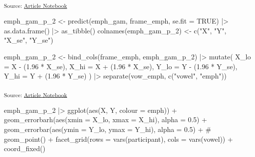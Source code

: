 \documentclass[
]{interact}
\newenvironment{Shaded}{\begin{snugshade}}{\end{snugshade}}
\newcommand{\AttributeTok}[1]{\textcolor[rgb]{0.40,0.45,0.13}{#1}}
\newcommand{\CommentTok}[1]{\textcolor[rgb]{0.37,0.37,0.37}{#1}}
\newcommand{\ConstantTok}[1]{\textcolor[rgb]{0.56,0.35,0.01}{#1}}
\newcommand{\FloatTok}[1]{\textcolor[rgb]{0.68,0.00,0.00}{#1}}
\newcommand{\FunctionTok}[1]{\textcolor[rgb]{0.28,0.35,0.67}{#1}}
\newcommand{\NormalTok}[1]{\textcolor[rgb]{0.00,0.23,0.31}{#1}}
\newcommand{\OtherTok}[1]{\textcolor[rgb]{0.00,0.23,0.31}{#1}}
\newcommand{\SpecialCharTok}[1]{\textcolor[rgb]{0.37,0.37,0.37}{#1}}
\newcommand{\StringTok}[1]{\textcolor[rgb]{0.13,0.47,0.30}{#1}}
\begin{document}
\textsubscript{Source:
\href{https://stefanocoretta.github.io/mv_uti/index.qmd.html}{Article
Notebook}}

\begin{Shaded}
\begin{Highlighting}[]
\NormalTok{emph\_gam\_p\_2 }\OtherTok{\textless{}{-}} \FunctionTok{predict}\NormalTok{(emph\_gam, frame\_emph, }\AttributeTok{se.fit =} \ConstantTok{TRUE}\NormalTok{) }\SpecialCharTok{|\textgreater{}}
  \FunctionTok{as.data.frame}\NormalTok{() }\SpecialCharTok{|\textgreater{}}
  \FunctionTok{as\_tibble}\NormalTok{()}
\FunctionTok{colnames}\NormalTok{(emph\_gam\_p\_2) }\OtherTok{\textless{}{-}} \FunctionTok{c}\NormalTok{(}\StringTok{"X"}\NormalTok{, }\StringTok{"Y"}\NormalTok{, }\StringTok{"X\_se"}\NormalTok{, }\StringTok{"Y\_se"}\NormalTok{)}

\NormalTok{emph\_gam\_p\_2 }\OtherTok{\textless{}{-}} \FunctionTok{bind\_cols}\NormalTok{(frame\_emph, emph\_gam\_p\_2) }\SpecialCharTok{|\textgreater{}}
  \FunctionTok{mutate}\NormalTok{(}
    \AttributeTok{X\_lo =}\NormalTok{ X }\SpecialCharTok{{-}}\NormalTok{ (}\FloatTok{1.96} \SpecialCharTok{*}\NormalTok{ X\_se),}
    \AttributeTok{X\_hi =}\NormalTok{ X }\SpecialCharTok{+}\NormalTok{ (}\FloatTok{1.96} \SpecialCharTok{*}\NormalTok{ X\_se),}
    \AttributeTok{Y\_lo =}\NormalTok{ Y }\SpecialCharTok{{-}}\NormalTok{ (}\FloatTok{1.96} \SpecialCharTok{*}\NormalTok{ Y\_se),}
    \AttributeTok{Y\_hi =}\NormalTok{ Y }\SpecialCharTok{+}\NormalTok{ (}\FloatTok{1.96} \SpecialCharTok{*}\NormalTok{ Y\_se)}
\NormalTok{  ) }\SpecialCharTok{|\textgreater{}} 
  \FunctionTok{separate}\NormalTok{(vow\_emph, }\FunctionTok{c}\NormalTok{(}\StringTok{"vowel"}\NormalTok{, }\StringTok{"emph"}\NormalTok{))}
\end{Highlighting}
\end{Shaded}

\textsubscript{Source:
\href{https://stefanocoretta.github.io/mv_uti/index.qmd.html}{Article
Notebook}}

\label{cell-fig-emph-part}
\begin{Shaded}
\begin{Highlighting}[]
\NormalTok{emph\_gam\_p\_2 }\SpecialCharTok{|\textgreater{}} 
  \FunctionTok{ggplot}\NormalTok{(}\FunctionTok{aes}\NormalTok{(X, Y, }\AttributeTok{colour =}\NormalTok{ emph)) }\SpecialCharTok{+}
  \FunctionTok{geom\_errorbarh}\NormalTok{(}\FunctionTok{aes}\NormalTok{(}\AttributeTok{xmin =}\NormalTok{ X\_lo, }\AttributeTok{xmax =}\NormalTok{ X\_hi), }\AttributeTok{alpha =} \FloatTok{0.5}\NormalTok{) }\SpecialCharTok{+}
  \FunctionTok{geom\_errorbar}\NormalTok{(}\FunctionTok{aes}\NormalTok{(}\AttributeTok{ymin =}\NormalTok{ Y\_lo, }\AttributeTok{ymax =}\NormalTok{ Y\_hi), }\AttributeTok{alpha =} \FloatTok{0.5}\NormalTok{) }\SpecialCharTok{+}
  \CommentTok{\# geom\_point() +}
  \FunctionTok{facet\_grid}\NormalTok{(}\AttributeTok{rows =} \FunctionTok{vars}\NormalTok{(participant), }\AttributeTok{cols =} \FunctionTok{vars}\NormalTok{(vowel)) }\SpecialCharTok{+}
  \FunctionTok{coord\_fixed}\NormalTok{()}
\end{Highlighting}
\end{Shaded}
\end{document}
